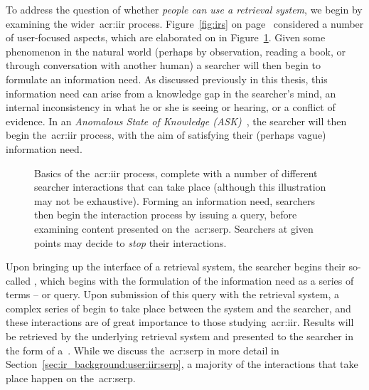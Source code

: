 To address the question of whether \emph{people can use a retrieval system}, we begin by examining the wider~\gls{acr:iir} process. Figure~\ref{fig:irs} on page~\pageref{fig:irs} considered a number of user-focused aspects, which are elaborated on in Figure~\ref{fig:iir}. Given some phenomenon in the natural world (perhaps by observation, reading a book, or through conversation with another human) a searcher will then begin to formulate an information need. As discussed previously in this thesis, this information need can arise from a knowledge gap in the searcher's mind, an internal inconsistency in what he or she is seeing or hearing, or a conflict of evidence. In an \emph{Anomalous State of Knowledge (ASK)}~\citep{belkin1980ask}, the searcher will then begin the~\gls{acr:iir} process, with the aim of satisfying their (perhaps vague) information need.

\begin{figure}[t!]
    \centering
    \caption[Basics of the~\gls{acr:iir} process]{Basics of the~\gls{acr:iir} process, complete with a number of different searcher interactions that can take place (although this illustration may not be exhaustive). Forming an information need, searchers then begin the interaction process by issuing a query, before examining content presented on the~\gls{acr:serp}. Searchers at given points may decide to \emph{stop} their interactions.}
    \label{fig:iir}
\end{figure}

Upon bringing up the interface of a retrieval system, the searcher begins their so-called , which begins with the formulation of the information need as a series of terms -- or query. Upon submission of this query with the retrieval system, a complex series of  begin to take place between the system and the searcher, and these interactions are of great importance to those studying~\gls{acr:iir}. Results will be retrieved by the underlying retrieval system and presented to the searcher in the form of a~. While we discuss the~\gls{acr:serp} in more detail in Section~\ref{sec:ir_background:user:iir:serp}, a majority of the interactions that take place happen on the~\gls{acr:serp}.


